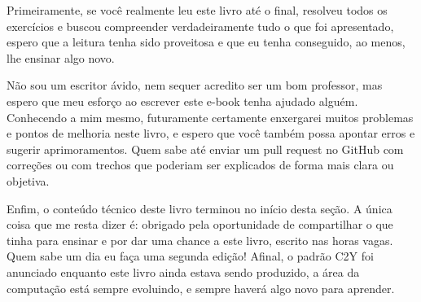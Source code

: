 Primeiramente, se você realmente leu este livro até o final, resolveu todos os 
exercícios e buscou compreender verdadeiramente tudo o que foi apresentado, 
espero que a leitura tenha sido proveitosa e que eu tenha conseguido, ao menos, 
lhe ensinar algo novo.

Não sou um escritor ávido, nem sequer acredito ser um bom professor, mas espero 
que meu esforço ao escrever este e-book tenha ajudado alguém. Conhecendo a mim 
mesmo, futuramente certamente enxergarei muitos problemas e pontos de melhoria 
neste livro, e espero que você também possa apontar erros e sugerir 
aprimoramentos. Quem sabe até enviar um pull request no GitHub com correções ou 
com trechos que poderiam ser explicados de forma mais clara ou objetiva.

Enfim, o conteúdo técnico deste livro terminou no início desta seção. A única 
coisa que me resta dizer é: obrigado pela oportunidade de compartilhar o que 
tinha para ensinar e por dar uma chance a este livro, escrito nas horas vagas. 
Quem sabe um dia eu faça uma segunda edição! Afinal, o padrão C2Y foi anunciado 
enquanto este livro ainda estava sendo produzido, a área da computação está 
sempre evoluindo, e sempre haverá algo novo para aprender.
